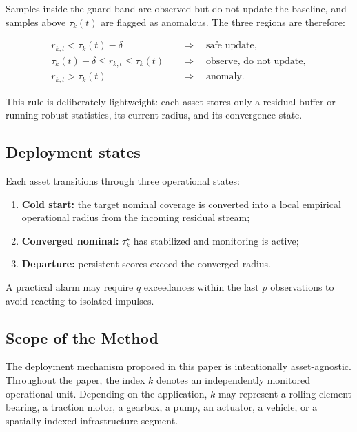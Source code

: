 \documentclass[11pt,a4paper]{article}
\begin{document}
Samples inside the guard band are observed but do not update the baseline, and samples above
$\tau_k(t)$ are flagged as anomalous. The three regions are therefore:

\begin{align}
r_{k,t}<\tau_k(t)-\delta
&\quad\Rightarrow\quad \text{safe update},\\
\tau_k(t)-\delta\le r_{k,t}\le\tau_k(t)
&\quad\Rightarrow\quad \text{observe, do not update},\\
r_{k,t}>\tau_k(t)
&\quad\Rightarrow\quad \text{anomaly}.
\end{align}

This rule is deliberately lightweight: each asset stores only a residual buffer or running robust
statistics, its current radius, and its convergence state.

\subsection{Deployment states}

Each asset transitions through three operational states:

\begin{enumerate}[leftmargin=1.5em]
    \item \textbf{Cold start:} the target nominal coverage is converted into a local empirical
operational radius from the incoming residual stream;
    \item \textbf{Converged nominal:} $\tau_k^\star$ has stabilized and monitoring is active;
    \item \textbf{Departure:} persistent scores exceed the converged radius.
\end{enumerate}

A practical alarm may require $q$ exceedances within the last $p$ observations to avoid reacting
to isolated impulses.

\subsection{Scope of the Method}

The deployment mechanism proposed in this paper is intentionally asset-agnostic.
Throughout the paper, the index $k$ denotes an independently monitored operational
unit. Depending on the application, $k$ may represent a rolling-element bearing,
a traction motor, a gearbox, a pump, an actuator, a vehicle, or a spatially
indexed infrastructure segment.
\end{document}
